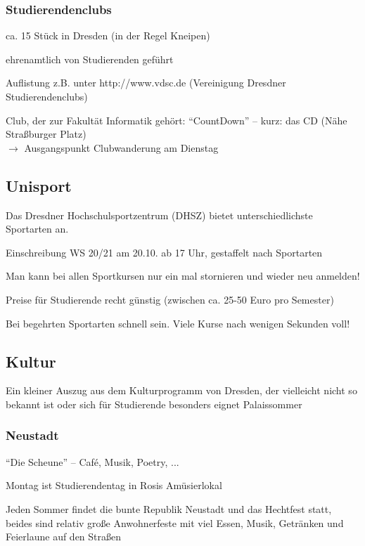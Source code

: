 \documentclass[a4paper,12pt]{scrreprt}
\begin{document}
\subsubsection{Studierendenclubs}
\begin{itemize*}
    \item ca. 15 Stück in Dresden (in der Regel Kneipen)
    \item ehrenamtlich von Studierenden geführt
    \item Auflistung z.B. unter http://www.vdsc.de (Vereinigung Dresdner Studierendenclubs)
    \item Club, der zur Fakultät Informatik gehört: \enquote{CountDown} -- kurz: das CD (Nähe Straßburger Platz)\\
    $\rightarrow$ Ausgangspunkt Clubwanderung am Dienstag
\end{itemize*}

\subsection{Unisport}
\begin{itemize*}
    \item Das Dresdner Hochschulsportzentrum (DHSZ) bietet unterschiedlichste Sportarten an.

    \item Einschreibung WS 20/21 am 20.10. ab 17 Uhr, gestaffelt nach Sportarten
    \item Man kann  bei allen Sportkursen nur ein mal stornieren und wieder neu anmelden!
    \item Preise für Studierende recht günstig (zwischen ca. 25-50 Euro pro Semester)
    \item Bei begehrten Sportarten schnell sein. Viele Kurse nach wenigen Sekunden voll!
\end{itemize*}

\subsection{Kultur}
Ein kleiner Auszug aus dem Kulturprogramm von Dresden, der vielleicht nicht so bekannt ist oder sich für Studierende besonders eignet
Palaissommer

\subsubsection{Neustadt}
\begin{itemize*}
    \item \enquote{Die Scheune} -- Café, Musik, Poetry, ...
    \item Montag ist Studierendentag in Rosis Amüsierlokal
    \item Jeden Sommer findet die bunte Republik Neustadt und das Hechtfest statt, beides sind relativ große Anwohnerfeste mit viel Essen, Musik, Getränken und Feierlaune auf den Straßen
\end{itemize*}
\end{document}
